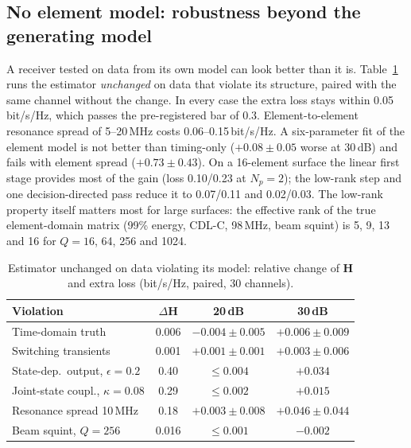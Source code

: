 \documentclass[conference,10pt]{IEEEtran}
\theoremstyle{remark}
\begin{document}
\subsection{No element model: robustness beyond the generating model}\label{sec:res-model}
A receiver tested on data from its own model can look better than it is. Table~\ref{tab:robust} runs the estimator
\emph{unchanged} on data that violate its structure, paired with the same channel without the change. In every case the
extra loss stays within 0.05\,bit/s/Hz, which passes the pre-registered bar of 0.3. Element-to-element resonance spread
of 5--20\,MHz costs 0.06--0.15\,bit/s/Hz. A six-parameter fit of the element model is not better than timing-only
($+0.08\pm0.05$ worse at 30\,dB) and fails with element spread ($+0.73\pm0.43$). On a 16-element surface the linear first
stage provides most of the gain (loss 0.10/0.23 at $N_p=2$); the low-rank step and one decision-directed pass reduce it
to 0.07/0.11 and 0.02/0.03. The low-rank property itself matters most for large surfaces: the effective rank of the
true element-domain matrix (99\% energy, CDL-C, 98\,MHz, beam squint) is 5, 9, 13 and 16 for $Q=16$, 64, 256 and 1024.

\begin{table}[t]\centering\footnotesize
\caption{Estimator unchanged on data violating its model: relative change of $\bm H$ and extra loss (bit/s/Hz, paired, 30 channels).}\label{tab:robust}
\setlength{\tabcolsep}{3pt}
\begin{tabular}{@{}lccc@{}}\toprule
Violation & $\Delta\bm H$ & 20\,dB & 30\,dB\\\midrule
Time-domain truth & 0.006 & $-0.004\pm0.005$ & $+0.006\pm0.009$\\
Switching transients & 0.001 & $+0.001\pm0.001$ & $+0.003\pm0.006$\\
State-dep.\ output, $\epsilon=0.2$ & 0.40 & $\le0.004$ & $+0.034$\\
Joint-state coupl., $\kappa=0.08$ & 0.29 & $\le0.002$ & $+0.015$\\
Resonance spread 10\,MHz & 0.18 & $+0.003\pm0.008$ & $+0.046\pm0.044$\\
Beam squint, $Q=256$ & 0.016 & $\le0.001$ & $-0.002$\\\bottomrule
\end{tabular}
\end{table}
\end{document}
